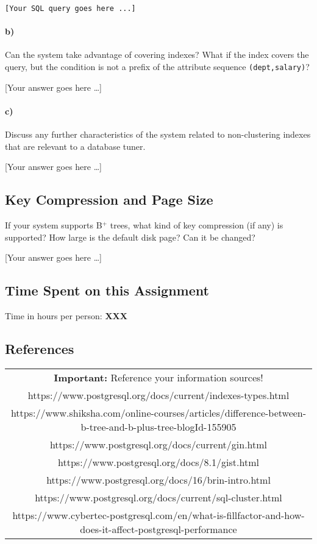 \documentclass[11pt]{scrartcl}
\newcommand{\youranswerhere}{[Your answer goes here \ldots]}
\begin{document}
\begin{lstlisting}[style=dbtsql]
[Your SQL query goes here ...]
\end{lstlisting}

\paragraph{b)}

Can the system take advantage of covering indexes? What if the index covers the query, but the condition is not a prefix of the attribute sequence \texttt{(dept,salary)}?

\youranswerhere{}

\paragraph{c)}

Discuss any further characteristics of the system related to non-clustering indexes that are relevant to a database tuner.

\youranswerhere{}

\subsection{Key Compression and Page Size}

If your system supports B$^+$ trees, what kind of key compression (if any) is supported? How large is the default disk page? Can it be changed?

\youranswerhere{}

\subsection*{Time Spent on this Assignment}

Time in hours per person: \textbf{XXX}

\subsection*{References}

\begin{table}[H]
  \centering
  \begin{tabular}{c}
    \hline
    \textbf{Important:} Reference your information sources! \tabularnewline
    https://www.postgresql.org/docs/current/indexes-types.html \tabularnewline
    https://www.shiksha.com/online-courses/articles/difference-between-b-tree-and-b-plus-tree-blogId-155905 \tabularnewline
    https://www.postgresql.org/docs/current/gin.html \tabularnewline
    https://www.postgresql.org/docs/8.1/gist.html \tabularnewline
    https://www.postgresql.org/docs/16/brin-intro.html \tabularnewline
    https://www.postgresql.org/docs/current/sql-cluster.html \tabularnewline
    https://www.cybertec-postgresql.com/en/what-is-fillfactor-and-how-does-it-affect-postgresql-performance \tabularnewline
    \hline
  \end{tabular}
\end{table}
\end{document}
